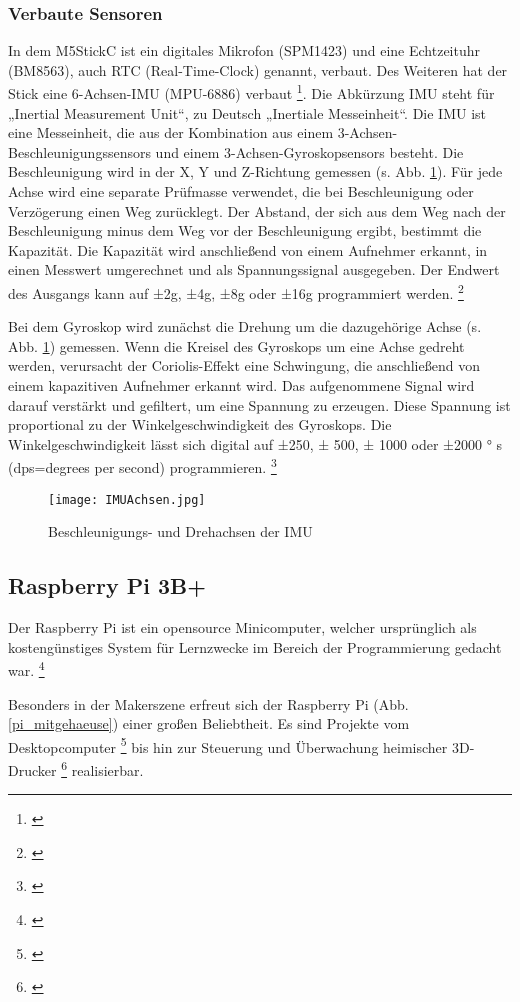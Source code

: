 \documentclass[a4paper,12pt]{article}
\begin{document}
\subsubsection{Verbaute Sensoren}
In dem M5StickC ist ein digitales Mikrofon (SPM1423) und eine Echtzeituhr (BM8563), auch RTC
(Real-Time-Clock) genannt, verbaut. Des Weiteren hat der Stick eine 6-Achsen-IMU (MPU-6886)
verbaut \footnote{\cite{M5STACK.}}. Die Abkürzung IMU steht für „Inertial Measurement Unit“, zu Deutsch
„Inertiale Messeinheit“. Die IMU ist eine Messeinheit, die aus der Kombination aus einem 3-Achsen-Beschleunigungssensors und einem 3-Achsen-Gyroskopsensors besteht. Die Beschleunigung
wird in der X, Y und Z-Richtung gemessen (s. Abb. \ref{IMUAchsen}). Für jede Achse wird eine separate Prüfmasse
verwendet, die bei Beschleunigung oder Verzögerung einen Weg zurücklegt. Der Abstand, der sich aus
dem Weg nach der Beschleunigung minus dem Weg vor der Beschleunigung ergibt, bestimmt die
Kapazität. Die Kapazität wird anschließend von einem Aufnehmer erkannt, in einen Messwert
umgerechnet und als Spannungssignal ausgegeben. Der Endwert des Ausgangs kann auf ±2g, ±4g,
±8g oder ±16g programmiert werden. \footnote{\cite{InvenSense.}}

Bei dem Gyroskop wird zunächst die Drehung um die dazugehörige Achse (s. Abb. \ref{IMUAchsen}) gemessen.
Wenn die Kreisel des Gyroskops um eine Achse gedreht werden, verursacht der Coriolis-Effekt eine
Schwingung, die anschließend von einem kapazitiven Aufnehmer erkannt wird. Das aufgenommene
Signal wird darauf verstärkt und gefiltert, um eine Spannung zu erzeugen. Diese Spannung ist
proportional zu der Winkelgeschwindigkeit des Gyroskops. Die Winkelgeschwindigkeit lässt sich
digital auf ±250, ± 500, ± 1000 oder ±2000 °
s
(dps=degrees per second) programmieren. \footnote{\cite{InvenSense.}}

\begin{figure}[H]	%
\begin{center}
\texttt{[image: IMUAchsen.jpg]}
\caption{Beschleunigungs- und Drehachsen der IMU
\protect\cite{InvenSense.}}
\label{IMUAchsen}
\end{center}
\end{figure}

\newpage

\subsection{Raspberry Pi 3B+}
Der Raspberry Pi ist ein opensource Minicomputer, welcher ursprünglich als kostengünstiges System für Lernzwecke im Bereich der Programmierung gedacht war. \footnote{\cite{RaspberryPi.20.08.2015}} \par
Besonders in der Makerszene erfreut sich der Raspberry Pi (Abb. \ref{pi_mitgehaeuse}) einer großen Beliebtheit. Es sind Projekte vom Desktopcomputer \footnote{\cite{RaspberryPi.20.08.2015}} bis hin zur Steuerung und Überwachung heimischer 3D-Drucker \footnote{\cite{Hauge.20.04.2022}} realisierbar.\\[3mm]
\end{document}
